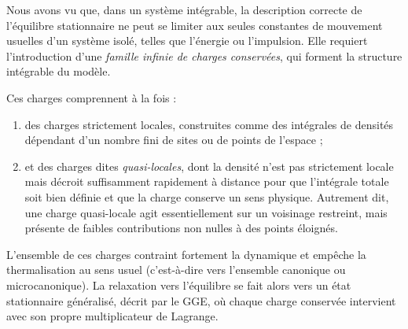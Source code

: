 

Nous avons vu que, dans un système intégrable, la description correcte de l’équilibre stationnaire ne peut se limiter aux seules constantes de mouvement usuelles d’un système isolé, telles que l’énergie ou l’impulsion. Elle requiert l’introduction d’une \emph{famille infinie de charges conservées}, qui forment la structure intégrable du modèle. 

Ces charges comprennent à la fois : 
\begin{enumerate}[label=$\roman*$]
    \item des charges strictement locales, construites comme des intégrales de densités dépendant d’un nombre fini de sites ou de points de l’espace ; 
    \item et des charges dites \emph{quasi-locales}, dont la densité n’est pas strictement locale mais décroit suffisamment rapidement à distance pour que l’intégrale totale soit bien définie et que la charge conserve un sens physique. Autrement dit, une charge quasi-locale agit essentiellement sur un voisinage restreint, mais présente de faibles contributions non nulles à des points éloignés.
\end{enumerate}

L’ensemble de ces charges contraint fortement la dynamique et empêche la thermalisation au sens usuel (c’est-à-dire vers l’ensemble canonique ou microcanonique). La relaxation vers l’équilibre se fait alors vers un état stationnaire généralisé, décrit par le \gls{GGE}, où chaque charge conservée intervient avec son propre multiplicateur de Lagrange.


